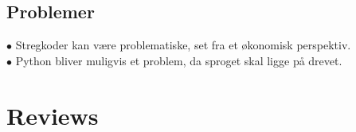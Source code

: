 \documentclass[a4paper]{article}
\begin{document}
\subsection*{Problemer}
$\bullet$ Stregkoder kan være problematiske, set fra et økonomisk perspektiv. \\
$\bullet$ Python bliver muligvis et problem, da sproget skal ligge på drevet.
\newpage
\section{Reviews}

\end{document}
